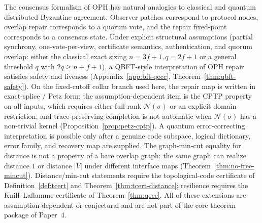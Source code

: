 \documentclass[11pt]{article}
\theoremstyle{remark}
\theoremstyle{plain}
\begin{document}
The consensus formalism of \textrm{OPH} has natural analogies to classical and quantum
distributed Byzantine agreement. Observer patches correspond to protocol nodes, overlap repair
corresponds to a quorum vote, and the repair fixed-point corresponds to a consensus state. Under
explicit structural assumptions (partial synchrony, one-vote-per-view, certificate semantics,
authentication, and quorum overlap: either the classical exact sizing \(n=3f+1,q=2f+1\) or a
general threshold \(q\) with \(2q\ge n+f+1\)), a \textrm{QBFT}-style interpretation
of \textrm{OPH} repair satisfies safety and liveness (Appendix~\ref{app:bft-qecc},
Theorem~\ref{thm:qbft-safety}). On the fixed-cutoff collar branch used here, the repair map is
written in exact-splice / Petz form; the assumption-dependent item is the \textrm{CPTP}
property on all inputs, which requires either full-rank $\mathcal{N}(\sigma)$ or an explicit
domain restriction, and trace-preserving completion is not automatic when
$\mathcal{N}(\sigma)$ has a non-trivial kernel
(Proposition~\ref{prop:petz-cptp}). A quantum error-correcting interpretation is possible only
after a genuine code subspace, logical dictionary, error family, and recovery map are supplied.
The graph-min-cut equality for distance is not a property of a bare overlap graph: the same graph
can realize distance \(1\) or distance \(|V|\) under different interface maps
(Theorem~\ref{thm:no-free-mincut}). Distance/min-cut statements require the topological-code
certificate of Definition~\ref{def:tcert} and Theorem~\ref{thm:tcert-distance}; resilience
requires the Knill--Laflamme certificate of Theorem~\ref{thm:qecc}. All of these extensions are
assumption-dependent or conjectural and are not part of the core theorem package of Paper~4.
\end{document}
